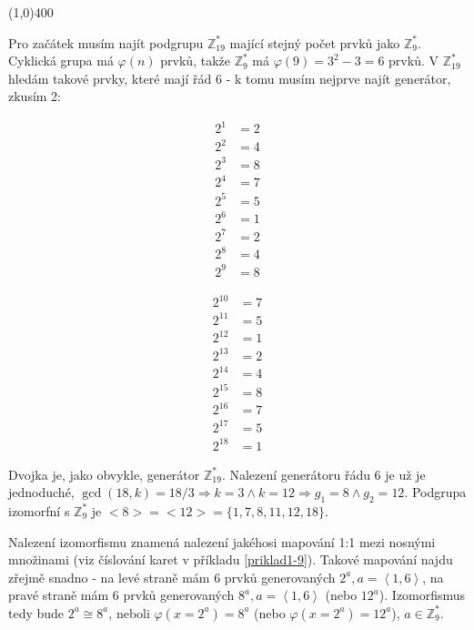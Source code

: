 \documentclass{article}
\begin{document}
\line(1,0){400}

Pro začátek musím najít podgrupu $\mathbb{Z}_{19}^*$ mající stejný počet prvků jako $\mathbb{Z}_{9}^*$. Cyklická grupa má $\varphi(n)$ prvků, takže $\mathbb{Z}_{9}^*$ má $\varphi(9) = 3^2 - 3 = 6$ prvků. V $\mathbb{Z}_{19}^*$ hledám takové prvky, které mají řád 6 - k tomu musím nejprve najít generátor, zkusím 2:

\begin{figure}[h]
  \hfill
  \begin{minipage}[t]{.49\textwidth}
    \begin{align*}
		2^1			& = 2\\
		2^2			& = 4\\
		2^3			& = 8\\
		2^4			& =	7\\
		2^5			& =	5\\
		2^6			& =	1\\
		2^7			& =	2\\
		2^8			& =	4\\
		2^9			& =	8
		\end{align*}
  \end{minipage}
  \hfill
  \begin{minipage}[t]{.49\textwidth}
    \begin{align*}
		2^{10}	& =	7\\
		2^{11}	& =	5\\
		2^{12}	& =	1\\		
		2^{13}	& =	2\\		
		2^{14}	& =	4\\		
		2^{15}	& =	8\\		
		2^{16}	& =	7\\
		2^{17}	& =	5\\
		2^{18}	& =	1
		\end{align*}
	\end{minipage}
  \hfill
\end{figure}

Dvojka je, jako obvykle, generátor $\mathbb{Z}_{19}^*$. Nalezení generátoru řádu 6 je už je jednoduché, $\gcd(18,k)=18/3 \Rightarrow k = 3 \wedge k = 12 \Rightarrow g_1 = 8 \wedge g_2 = 12$. Podgrupa izomorfní s $\mathbb{Z}_{9}^*$ je ${<}8{>} = {<}12{>} = \{1,7,8,11,12,18\}$. 

Nalezení izomorfismu znamená nalezení jakéhosi mapování 1:1 mezi nosnými množinami (viz číslování karet v příkladu \ref{priklad1-9}). Takové mapování najdu zřejmě snadno - na levé straně mám 6 prvků generovaných $2^a, a = \left<1,6\right>$, na pravé straně mám 6 prvků generovaných $8^a, a = \left<1,6\right>$ (nebo $12^a$). Izomorfismus tedy bude $2^a \cong 8^a$, neboli $\varphi(x=2^a) = 8^a$ (nebo $\varphi(x=2^a) = 12^a$), $a \in \mathbb{Z}_{9}^*$.       
\end{document}

